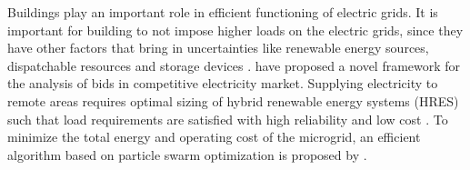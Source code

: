 \documentclass{article}
\begin{document}

Buildings play an important role in efficient functioning of electric grids. 
It is important for building to not impose higher loads on the electric grids, since they have other factors that bring in uncertainties like renewable energy sources, dispatchable resources and storage devices \citep{tf_pricing}.  
\cite{cmot_bid} have proposed a novel framework for the analysis of bids in competitive electricity market. 
Supplying electricity to remote areas requires optimal sizing of hybrid renewable energy systems (HRES) such that load requirements are satisfied with high reliability and low cost \citep{tf_renewable}. 
To minimize the total energy and operating cost of the microgrid, an efficient algorithm based on particle swarm optimization is proposed by \cite{tf_swarm}.  
\end{document}
